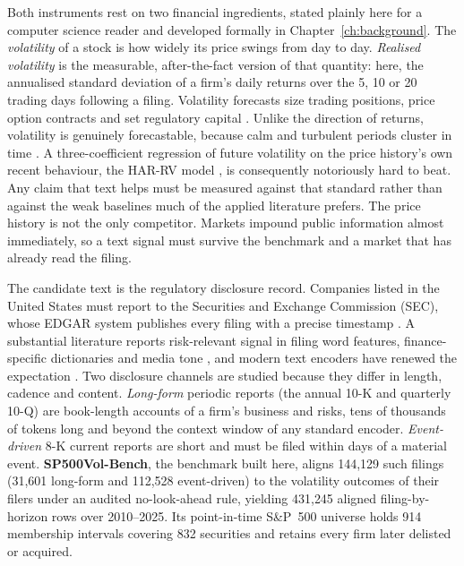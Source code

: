 Both instruments rest on two financial ingredients, stated plainly here for a computer science reader and developed formally in Chapter~\ref{ch:background}. The \emph{volatility} of a stock is how widely its price swings from day to day. \emph{Realised volatility} is the measurable, after-the-fact version of that quantity: here, the annualised standard deviation of a firm's daily returns over the 5, 10 or 20 trading days following a filing. %
Volatility forecasts size trading positions, price option contracts and set regulatory capital \cite{andersen2003modeling,poon2003forecasting}. Unlike the direction of returns, volatility is genuinely forecastable, because calm and turbulent periods cluster in time \cite{bollerslev1986garch,engle1982arch}. A three-coefficient regression of future volatility on the price history's own recent behaviour, the HAR-RV model \cite{corsi2009har}, is consequently notoriously hard to beat. Any claim that text helps must be measured against that standard rather than against the weak baselines much of the applied literature prefers. The price history is not the only competitor. Markets impound public information almost immediately, so a text signal must survive the benchmark and a market that has already read the filing.

The candidate text is the regulatory disclosure record. Companies listed in the United States must report to the Securities and Exchange Commission (SEC), whose EDGAR system publishes every filing with a precise timestamp \cite{sec2024edgar}. A substantial literature reports risk-relevant signal in filing word features, finance-specific dictionaries and media tone \cite{kogan2009predicting,loughran2011liability,tetlock2007giving}, and modern text encoders have renewed the expectation \cite{beltagy2020longformer,devlin2019bert}. Two disclosure channels are studied because they differ in length, cadence and content. \emph{Long-form} periodic reports (the annual 10-K and quarterly 10-Q) are book-length accounts of a firm's business and risks, tens of thousands of tokens long and beyond the context window of any standard encoder. \emph{Event-driven} 8-K current reports are short and must be filed within days of a material event. \textbf{SP500Vol-Bench}, the benchmark built here, aligns 144{,}129 such filings (31{,}601 long-form and 112{,}528 event-driven) to the volatility outcomes of their filers under an audited no-look-ahead rule, %
yielding 431{,}245 aligned filing-by-horizon rows over 2010--2025. %
Its point-in-time S\&P~500 universe holds 914 membership intervals covering 832 securities and retains every firm later delisted or acquired. %

